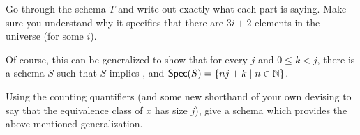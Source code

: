 \begin{aside}
    Go through the schema $T$ and write out exactly what each part is saying. Make sure you understand why it specifies that there are $3i + 2$ elements in the universe (for some $i$). 
\end{aside}

Of course, this can be generalized to show that for every $j$ and $0\leq k<j$, there is a schema $S$ such that $S$ implies \eqr, and $\mbox{$\mathsf{Spec}(S)$}=\{nj+k\mid n\in \mathbb{N}\}$. 

\begin{aside}
    Using the counting quantifiers (and some new shorthand of your own devising to say that the equivalence class of $x$ has size $j$), give a schema which provides the above-mentioned generalization. 
\end{aside}
